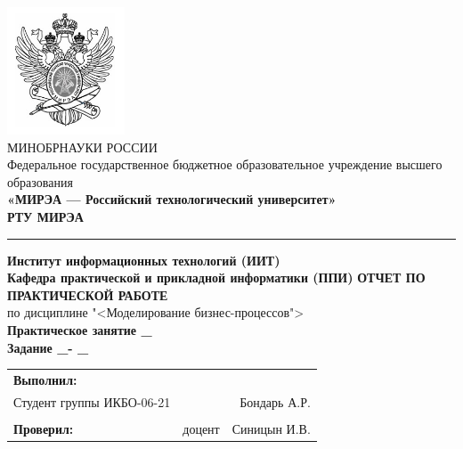 \begin{titlepage}
	
	\thispagestyle{fancy}
	\renewcommand{\headrulewidth}{0pt}
	\setlength{\headheight}{17.0pt}

	\begin{center}
		\includegraphics[scale=0.5]{./res/logo}\\ %
		МИНОБРНАУКИ РОССИИ\\
		Федеральное государственное бюджетное образовательное
		учреждение высшего образования\\
		\textbf{«МИРЭА --- Российский технологический университет»}\\
		\textbf{\large РТУ МИРЭА}\\
		\bigskip \hrule \smallskip
		\textbf{
			Институт информационных технологий (ИИТ)\\
			Кафедра практической и прикладной информатики (ППИ)
		}
		\vfill
		\textbf{\large ОТЧЕТ ПО ПРАКТИЧЕСКОЙ РАБОТЕ}\\
		по дисциплине "<Моделирование бизнес-процессов">\\
		\vfill
		\textbf{
			Практическое занятие \No\_\\
			Задание \No\_- \No\_
		}
		\vfill
		\vfill
		\begin{tabular}{lrr}
			\textbf{Выполнил:} & &\\
			Студент группы ИКБО-06-21 & & Бондарь А.Р. \\\\
			\textbf{Проверил:} &  доцент & Синицын И.В. \\
		\end{tabular}
		\vfill
	\end{center}
\end{titlepage}
\setcounter{page}{2}
\clearpage

